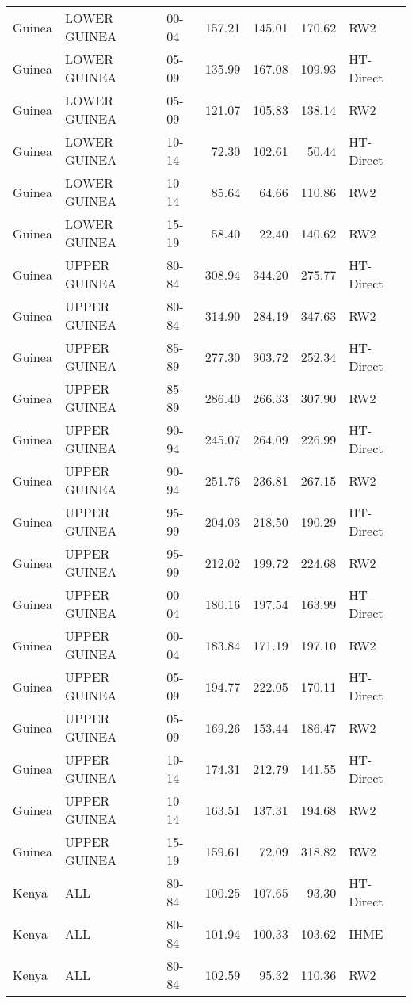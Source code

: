 \begin{longtable}{lllrrrl}
  Guinea & LOWER GUINEA & 00-04 & 157.21 & 145.01 & 170.62 & RW2 \\ 
  Guinea & LOWER GUINEA & 05-09 & 135.99 & 167.08 & 109.93 & HT-Direct \\ 
  Guinea & LOWER GUINEA & 05-09 & 121.07 & 105.83 & 138.14 & RW2 \\ 
  Guinea & LOWER GUINEA & 10-14 & 72.30 & 102.61 & 50.44 & HT-Direct \\ 
  Guinea & LOWER GUINEA & 10-14 & 85.64 & 64.66 & 110.86 & RW2 \\ 
  Guinea & LOWER GUINEA & 15-19 & 58.40 & 22.40 & 140.62 & RW2 \\ 
  Guinea & UPPER GUINEA & 80-84 & 308.94 & 344.20 & 275.77 & HT-Direct \\ 
  Guinea & UPPER GUINEA & 80-84 & 314.90 & 284.19 & 347.63 & RW2 \\ 
  Guinea & UPPER GUINEA & 85-89 & 277.30 & 303.72 & 252.34 & HT-Direct \\ 
  Guinea & UPPER GUINEA & 85-89 & 286.40 & 266.33 & 307.90 & RW2 \\ 
  Guinea & UPPER GUINEA & 90-94 & 245.07 & 264.09 & 226.99 & HT-Direct \\ 
  Guinea & UPPER GUINEA & 90-94 & 251.76 & 236.81 & 267.15 & RW2 \\ 
  Guinea & UPPER GUINEA & 95-99 & 204.03 & 218.50 & 190.29 & HT-Direct \\ 
  Guinea & UPPER GUINEA & 95-99 & 212.02 & 199.72 & 224.68 & RW2 \\ 
  Guinea & UPPER GUINEA & 00-04 & 180.16 & 197.54 & 163.99 & HT-Direct \\ 
  Guinea & UPPER GUINEA & 00-04 & 183.84 & 171.19 & 197.10 & RW2 \\ 
  Guinea & UPPER GUINEA & 05-09 & 194.77 & 222.05 & 170.11 & HT-Direct \\ 
  Guinea & UPPER GUINEA & 05-09 & 169.26 & 153.44 & 186.47 & RW2 \\ 
  Guinea & UPPER GUINEA & 10-14 & 174.31 & 212.79 & 141.55 & HT-Direct \\ 
  Guinea & UPPER GUINEA & 10-14 & 163.51 & 137.31 & 194.68 & RW2 \\ 
  Guinea & UPPER GUINEA & 15-19 & 159.61 & 72.09 & 318.82 & RW2 \\ 
  Kenya & ALL & 80-84 & 100.25 & 107.65 & 93.30 & HT-Direct \\ 
  Kenya & ALL & 80-84 & 101.94 & 100.33 & 103.62 & IHME \\ 
  Kenya & ALL & 80-84 & 102.59 & 95.32 & 110.36 & RW2 \\ 

\end{longtable}
